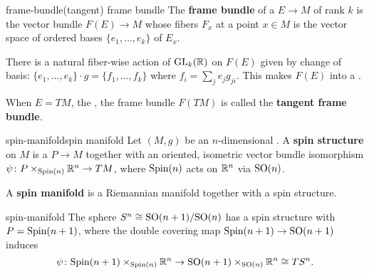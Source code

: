 \begin{topic}{frame-bundle}{(tangent) frame bundle}
    The \textbf{frame bundle} of a  $E \to M$ of rank $k$ is the vector bundle $F(E) \to M$ whose fibers $F_x$ at a point $x \in M$ is the vector space of ordered bases $\{ e_1, \ldots, e_k \}$ of $E_x$.
    
    There is a natural fiber-wise action of $\textup{GL}_k(\mathbb{R})$ on $F(E)$ given by change of basis: $\{ e_1, \ldots, e_k \} \cdot g = \{ f_1, \ldots, f_k \}$ where $f_i = \sum_j e_j g_{ji}$. This makes $F(E)$ into a .
    
    When $E = TM$, the , the frame bundle $F(TM)$ is called the \textbf{tangent frame bundle}.
\end{topic}

\begin{topic}{spin-manifold}{spin manifold}
    Let $(M, g)$ be an $n$-dimensional  . A \textbf{spin structure} on $M$ is a  $P \to M$ together with an oriented, isometric vector bundle isomorphism $\psi \colon P \times_{\textup{Spin}(n)} \mathbb{R}^n \to TM$, where $\textup{Spin}(n)$ acts on $\mathbb{R}^n$ via $\textup{SO}(n)$.
    
    A \textbf{spin manifold} is a Riemannian manifold together with a spin structure.
\end{topic}

\begin{example}{spin-manifold}
    The sphere $S^n \cong \textup{SO}(n + 1) / \textup{SO}(n)$ has a spin structure with $P = \textup{Spin}(n + 1)$, where the double covering map $\textup{Spin}(n + 1) \to \textup{SO}(n + 1)$ induces
    \[ \psi \colon \textup{Spin}(n + 1) \times_{\textup{Spin}(n)} \mathbb{R}^n \to \textup{SO}(n + 1) \times_{\textup{SO}(n)} \mathbb{R}^n \cong T S^n . \]
\end{example}

